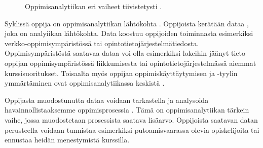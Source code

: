 \begin{figure}[h]
    \centering
    \caption{Oppimisanalytiikan eri vaiheet tiivistetysti \citep{clowLearningAnalyticsCycle2012}.}
\end{figure}

Syklissä oppija on oppimisanalytiikan lähtökohta \citep{clowLearningAnalyticsCycle2012}. Oppijoista kerätään dataa \citep{wolffImprovingRetentionPredicting2013}, joka on analyiikan lähtökohta. Data koostuu oppijoiden toiminnasta esimerkiksi verkko-oppimisympäristössä tai opintotietojärjestelmätiedosta. Oppimisympäristöstä saatavaa dataa voi olla esimerkiksi lokeihin jäänyt tieto oppijan oppimisympäristössä liikkumisesta tai opintotietojärjestelmässä aiemmat kurssisuoritukset. Toisaalta myös oppijan oppimiskäyttäytymisen ja -tyylin ymmärtäminen ovat oppimisanalytiikassa keskistä \citep{hasanPredictingStudentPerformance2020}.

Oppijasta muodostunutta dataa voidaan tarkastella ja analysoida havainnollistaaksemme oppimisprosessia \citep{clowLearningAnalyticsCycle2012}. Tämä on oppimisanalytiikan tärkein vaihe, jossa muodostetaan prosessista saatava lisäarvo. Oppijoista saatavan datan perusteella voidaan tunnistaa esimerkiksi putoamisvaarassa olevia opiskelijoita tai ennustaa heidän menestymistä kurssilla.


